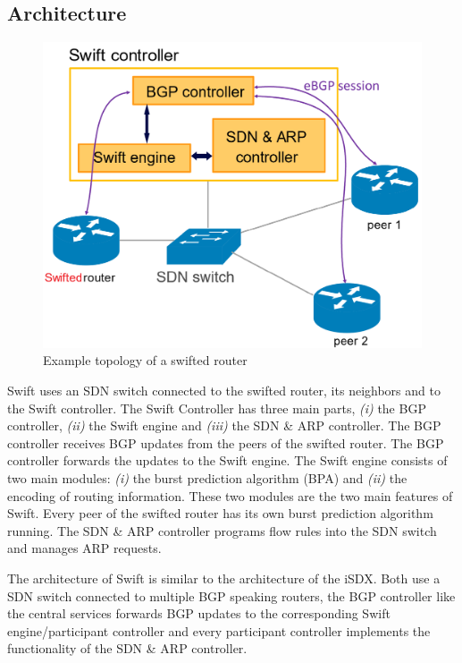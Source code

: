 \subsection{\label{chapter2:Swift:Architecture_SWift}Architecture}

\begin{figure}[h]
\center
\includegraphics[scale = 0.3]{Figures/swift_topo_cropped.pdf}
\caption{Example topology of a swifted router \cite{swift}}
\end{figure}

Swift uses an SDN switch connected to the swifted router, its neighbors and to the Swift controller. The Swift Controller has three main parts, \emph{(i)} the BGP controller, \emph{(ii)} the Swift engine and \emph{(iii)} the SDN \& ARP controller. The BGP controller receives BGP updates from the peers of the swifted router. The BGP controller forwards the updates to the Swift engine. The Swift engine consists of two main modules: \emph{(i)} the burst prediction algorithm (BPA) and \emph{(ii)} the encoding of routing information. These two modules are the two main features of Swift. Every peer of the swifted router has its own burst prediction algorithm running. The SDN \& ARP controller programs flow rules into the SDN switch and manages ARP requests. 

The architecture of Swift is similar to the architecture of the iSDX. Both use a SDN switch connected to multiple BGP speaking routers, the BGP controller like the central services forwards BGP updates to the corresponding Swift engine/participant controller and every participant controller implements the functionality of the SDN \& ARP controller. 


